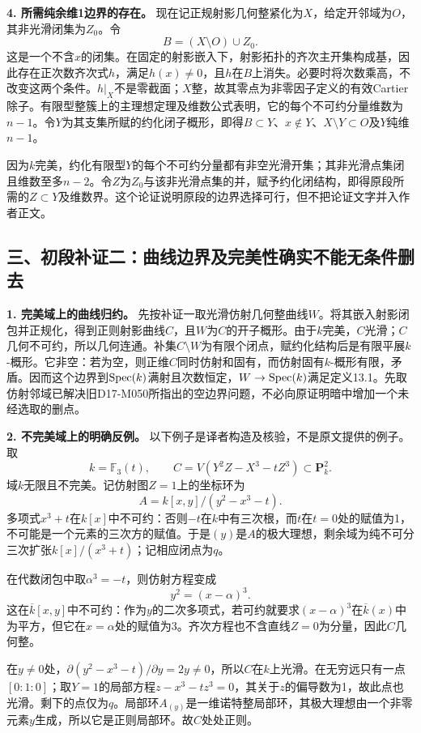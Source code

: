\noindent\textbf{4. 所需纯余维1边界的存在。}
现在记正规射影几何整紧化为$X$，给定开邻域为$O$，其非光滑闭集为$Z_0$。令
\[
B=(X\setminus O)\cup Z_0.
\]
这是一个不含$x$的闭集。在固定的射影嵌入下，射影拓扑的齐次主开集构成基，因此存在正次数齐次式$h$，满足$h(x)\ne0$，且$h$在$B$上消失。必要时将次数乘高，不改变这两个条件。$h|_X$不是零截面；$X$整，故其零点为非零因子定义的有效Cartier除子。有限型整簇上的主理想定理及维数公式表明，它的每个不可约分量维数为$n-1$。令$Y$为其支集所赋的约化闭子概形，即得$B\subset Y$、$x\notin Y$、$X\setminus Y\subset O$及$Y$纯维$n-1$。

因为$k$完美，约化有限型$Y$的每个不可约分量都有非空光滑开集；其非光滑点集闭且维数至多$n-2$。令$Z$为$Z_0$与该非光滑点集的并，赋予约化闭结构，即得原段所需的$Z\subset Y$及维数界。这个论证说明原段的边界选择可行，但不把论证文字并入作者正文。

\subsection*{三、初段补证二：曲线边界及完美性确实不能无条件删去}

\noindent\textbf{1. 完美域上的曲线归约。}
先按补证一取光滑仿射几何整曲线$W$。将其嵌入射影闭包并正规化，得到正则射影曲线$C$，且$W$为$C$的开子概形。由于$k$完美，$C$光滑；$C$几何不可约，所以几何连通。补集$C\setminus W$为有限个闭点，赋约化结构后是有限平展$k$-概形。它非空：若为空，则正维$C$同时仿射和固有，而仿射固有$k$-概形有限，矛盾。因而这个边界到$\operatorname{Spec}(k)$满射且次数恒定，$W\to\operatorname{Spec}(k)$满足定义13.1。先取仿射邻域已解决旧D17-M050所指出的空边界问题，不必向原证明暗中增加一个未经选取的删点。

\noindent\textbf{2. 不完美域上的明确反例。}
以下例子是译者构造及核验，不是原文提供的例子。取
\[
k=\mathbb F_3(t),\qquad
C=V(Y^2Z-X^3-tZ^3)\subset\mathbf P^2_k.
\]
域$k$无限且不完美。记仿射图$Z=1$上的坐标环为
\[
A=k[x,y]/(y^2-x^3-t).
\]
多项式$x^3+t$在$k[x]$中不可约：否则$-t$在$k$中有三次根，而$t$在$t=0$处的赋值为1，不可能是一个元素的三次方的赋值。于是$(y)$是$A$的极大理想，剩余域为纯不可分三次扩张$k[x]/(x^3+t)$；记相应闭点为$q$。

在代数闭包中取$\alpha^3=-t$，则仿射方程变成
\[
y^2=(x-\alpha)^3.
\]
这在$\overline k[x,y]$中不可约：作为$y$的二次多项式，若可约就要求$(x-\alpha)^3$在$\overline k(x)$中为平方，但它在$x=\alpha$处的赋值为3。齐次方程也不含直线$Z=0$为分量，因此$C$几何整。

在$y\ne0$处，$\partial(y^2-x^3-t)/\partial y=2y\ne0$，所以$C$在$k$上光滑。在无穷远只有一点$[0:1:0]$；取$Y=1$的局部方程$z-x^3-tz^3=0$，其关于$z$的偏导数为1，故此点也光滑。剩下的点仅为$q$。局部环$A_{(y)}$是一维诺特整局部环，其极大理想由一个非零元素$y$生成，所以它是正则局部环。故$C$处处正则。

